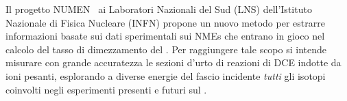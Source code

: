 Il progetto NUMEN~\cite{cappuzzello:epja18} ai Laboratori Nazionali del Sud (LNS) dell'Istituto Nazionale di Fisica Nucleare (INFN) propone un nuovo metodo per estrarre informazioni basate sui dati sperimentali sui NMEs che entrano in gioco nel calcolo del tasso di dimezzamento del \doppiobeta{}. 
Per raggiungere tale scopo si intende misurare con grande accuratezza le sezioni d'urto di reazioni di DCE indotte da ioni pesanti, esplorando a diverse energie del fascio incidente \emph{tutti} gli isotopi coinvolti negli esperimenti presenti e futuri sul \doppiobeta{}.


